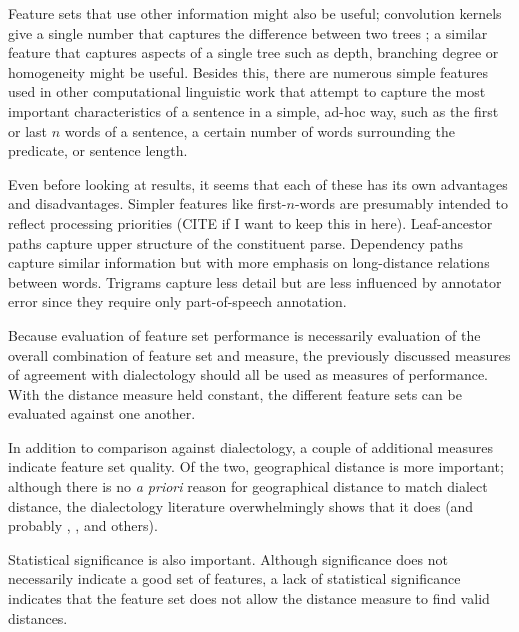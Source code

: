 Feature sets that use other information might also be useful;
convolution kernels give a single number that captures the difference
between two trees \cite{collins01}; a similar feature that captures
aspects of a single tree such as depth, branching degree or
homogeneity might be useful. Besides this, there are numerous simple
features used in other computational linguistic work that attempt to
capture the most important characteristics of a sentence in a simple,
ad-hoc way, such as the first or last $n$ words of a sentence, a
certain number of words surrounding the predicate, or sentence length.

Even before looking at results, it seems that each of these has its
own advantages and disadvantages. Simpler features like
first-$n$-words are presumably intended to reflect
processing priorities (CITE if I want to keep this in
here). Leaf-ancestor paths capture upper structure of the constituent
parse. Dependency paths capture similar information but with more
emphasis on long-distance relations between words. Trigrams capture
less detail but are less influenced by annotator error since they
require only part-of-speech annotation.


Because evaluation of feature set performance is necessarily evaluation
of the overall combination of feature set and measure, the previously
discussed measures of agreement with dialectology should all be used
as measures of performance. With the distance measure held constant,
the different feature sets can be evaluated against one another.

In addition to comparison against dialectology, a couple of additional
measures indicate feature set quality. Of the two, geographical
distance is more important; although there is no {\it a priori} reason
for geographical distance to match dialect distance, the dialectology
literature overwhelmingly shows that it does \cite{gooskens04a} (and
probably \cite{heeringa04}, \cite{kondrak02}, and others).

Statistical significance is also important. Although significance does not
necessarily indicate a good set of features, a lack of statistical
significance indicates that the feature set does not allow the distance
measure to find valid distances.

